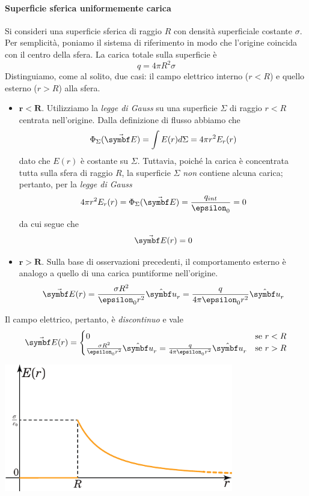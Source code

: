 \paragraph{Superficie sferica uniformemente carica}
Si consideri una superficie sferica di raggio $R$ con densità superficiale costante $\sigma$. Per semplicità, poniamo il sistema di riferimento in modo che l'origine coincida con il centro della sfera.
La carica totale sulla superficie è
\begin{equation}
	q=4\pi R^2 \sigma
\end{equation}
Distinguiamo, come al solito, due casi: il campo elettrico interno ($r<R$) e quello esterno ($r>R$) alla sfera.
\begin{itemize}
	\item $\mathbf{r<R}$. Utilizziamo la \textit{legge di Gauss} su una superficie $\Sigma$ di raggio $r<R$ centrata nell'origine. Dalla definizione di flusso abbiamo che
	\begin{equation*}
		\Phi_{\Sigma}(\vba{E})=\int E(r)d\Sigma=4\pi r^2 E_r(r)
	\end{equation*}
dato che $E(r)$ è costante su $\Sigma$.
Tuttavia, poiché la carica è concentrata tutta sulla sfera di raggio $R$, la superficie $\Sigma$ \textit{non} contiene alcuna carica; pertanto, per la \textit{legge di Gauss}
\begin{equation*}
	4\pi r^2 E_r(r)=\Phi_{\Sigma}(\vba{E})=\frac{q_{int}}{\epsilon_0}=0
\end{equation*}
da cui segue che
\begin{equation}
	\vba{E}(r)=0
\end{equation}
\item $\mathbf{r>R}$. Sulla base di osservazioni precedenti, il comportamento esterno è analogo a quello di una carica puntiforme nell'origine.
\begin{equation}
	\vba{E}(r)=\frac{\sigma R^2}{\epsilon_0r^2}\vbh{u}_r=\frac{q}{4\pi\epsilon_0r^2}\vbh{u}_r
\end{equation}
\end{itemize}
Il campo elettrico, pertanto, è \textit{discontinuo} e vale
\begin{equation}
	\vba{E}(r)=\begin{cases}
		0&\text{se}\ r< R\\
		\frac{\sigma R^2}{\epsilon_0r^2}\vbh{u}_r=\frac{q}{4\pi\epsilon_0r^2}\vbh{u}_r &\text{se}\ r> R
	\end{cases}
\end{equation}
\begin{center}
	\includegraphics[width=0.75\textwidth]{images/chp3/chp3sferacavagraf1.pdf}
\end{center}
